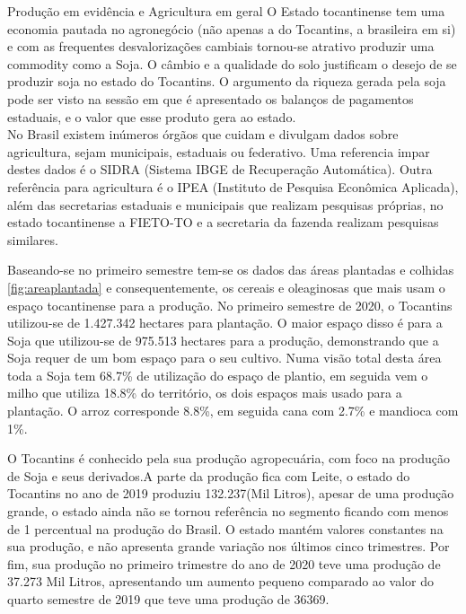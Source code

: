  \begin{smbox}[label={labelbox},nameref={Agricultura}]{Produção em evidência e Agricultura em geral}
 	O Estado tocantinense tem uma economia pautada no agronegócio (não apenas a do Tocantins, a brasileira em si) e com as frequentes desvalorizações cambiais tornou-se atrativo produzir uma commodity como a Soja. O câmbio e a qualidade do solo justificam o desejo de se produzir soja no  estado do Tocantins. O argumento da riqueza gerada pela soja pode ser visto na sessão em que é apresentado os balanços de pagamentos estaduais, e o valor que esse produto gera ao estado.
\\
 No Brasil existem inúmeros órgãos que cuidam e divulgam dados sobre agricultura, sejam municipais, estaduais ou federativo. Uma referencia impar destes dados é o SIDRA (Sistema IBGE de Recuperação Automática). Outra referência para agricultura é o IPEA (Instituto de Pesquisa Econômica Aplicada), além das secretarias estaduais e municipais que realizam pesquisas próprias, no estado tocantinense a FIETO-TO e a secretaria da fazenda realizam pesquisas similares.
\end{smbox}

\par Baseando-se no primeiro semestre tem-se os dados das áreas plantadas e colhidas \ref{fig:areaplantada} e consequentemente, os cereais e oleaginosas que mais usam o espaço tocantinense para a produção. No primeiro semestre de 2020, o Tocantins utilizou-se de 1.427.342 hectares para plantação. O maior espaço disso é para a Soja que utilizou-se de 975.513 hectares para a produção, demonstrando que a Soja requer de um bom espaço para o seu cultivo. Numa visão total desta área toda a Soja tem 68.7\% de utilização do espaço de plantio, em seguida vem o milho que utiliza 18.8\% do território, os dois espaços mais usado para a plantação. O arroz corresponde 8.8\%, em seguida cana com 2.7\% e mandioca com 1\%.

\par O Tocantins é conhecido pela sua produção agropecuária, com foco na produção de Soja e seus derivados.A parte da produção fica com Leite, o estado do Tocantins no ano de 2019 produziu 132.237(Mil Litros), apesar de uma produção grande, o estado ainda não se tornou referência no segmento ficando com menos de 1 percentual na produção do Brasil. O estado mantém valores constantes na sua produção, e não apresenta grande variação nos últimos cinco trimestres. Por fim, sua produção no primeiro trimestre do ano de 2020 teve uma produção de 37.273 Mil Litros, apresentando um aumento pequeno comparado ao valor do quarto semestre de 2019 que teve uma produção de 36369. 


